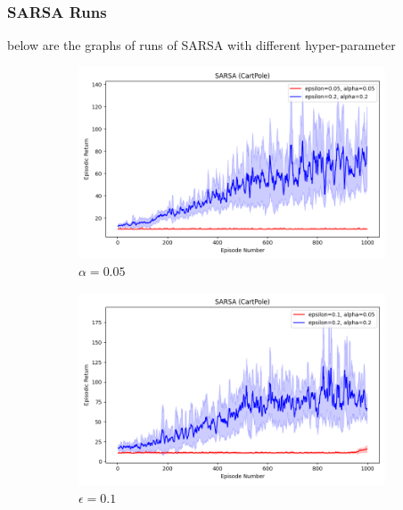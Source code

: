 \documentclass[11pt, a4]{article}
\begin{document}
			\subsubsection{SARSA Runs}
			below are the graphs of runs of SARSA with different hyper-parameter
			\noindent
			\begin{figure}[h]
				\centering
				\begin{subfigure}[h]{0.3\textwidth}
					\centering
					\includegraphics[width=\textwidth]{../plots/sarsa_0.05_0.05vs0.2_0.2.png}
					\caption{$\alpha = 0.05$}
				\end{subfigure}
				\hfill
				\begin{subfigure}[h]{0.3\textwidth}
					\centering
					\includegraphics[width=\textwidth]{../plots/sarsa_0.05_0.1vs0.2_0.2.png}
					\caption{$\epsilon = 0.1$}
				\end{subfigure}
				\hfill
				\begin{subfigure}[h]{0.3\textwidth}
					\centering

\end{subfigure}
\end{figure}
\end{document}
